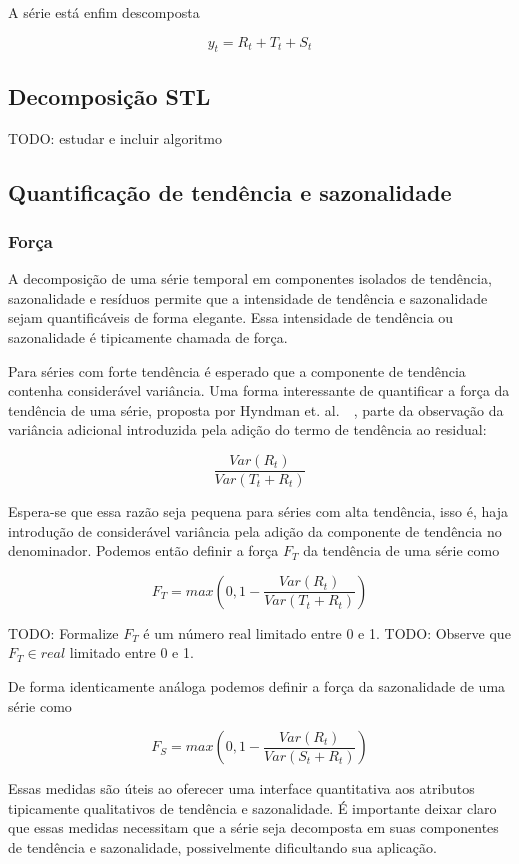 A série está enfim descomposta

$$ y_t = R_t + T_t + S_t $$

\subsection{Decomposição STL}

TODO: estudar e incluir algoritmo

\subsection{Quantificação de tendência e sazonalidade}

\subsubsection{Força}

A decomposição de uma série temporal em componentes isolados de tendência,
sazonalidade e resíduos permite que a intensidade de tendência e sazonalidade
sejam quantificáveis de forma elegante. Essa intensidade de tendência ou
sazonalidade é tipicamente chamada de força.

Para séries com forte tendência é esperado que a componente de tendência
contenha considerável variância. Uma forma interessante de quantificar a força
da tendência de uma série, proposta por Hyndman et. al.~~\cite{hyndman}, parte
da observação da variância adicional introduzida pela adição do termo de
tendência ao residual:

$$ \frac{Var(R_t)}{Var(T_t + R_t)} $$

Espera-se que essa razão seja pequena para séries com alta tendência, isso é,
haja introdução de considerável variância pela adição da componente de
tendência no denominador. Podemos então definir a força $F_T$ da tendência de
uma série como

$$ F_T = max\left(0, 1 - \frac{Var(R_t)}{Var(T_t + R_t)}\right) $$

TODO: Formalize $F_T$ é um número real limitado entre 0 e 1.
TODO: Observe que $F_T \in real$ limitado entre 0 e 1.

De forma identicamente análoga podemos definir a força da sazonalidade de uma
série como

$$ F_S = max\left(0, 1 - \frac{Var(R_t)}{Var(S_t + R_t)}\right) $$

Essas medidas são úteis ao oferecer uma interface quantitativa aos atributos
tipicamente qualitativos de tendência e sazonalidade. É importante deixar
claro que essas medidas necessitam que a série seja decomposta em suas
componentes de tendência e sazonalidade, possivelmente dificultando sua
aplicação.

